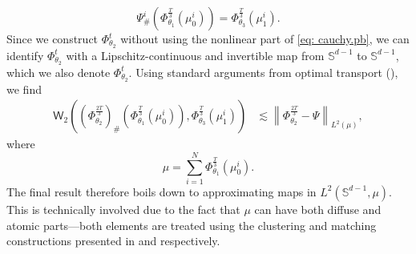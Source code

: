\documentclass[a4paper,11pt]{article}
\theoremstyle{plain}
\renewcommand{\S}{\mathbb{S}^{d-1}}
\numberwithin{equation}{section}
\begin{document}
\begin{enumerate}
\begin{equation*}
    \Psi^i_\#\left(\Phi_{\theta_1}^{\frac{T}{3}}(\mu_0^i)\right) = \Phi^{\frac{T}{3}}_{\theta_3}(\mu_1^i).
\end{equation*} 
Since we construct $\Phi^t_{\theta_2}$ without using the nonlinear part of \eqref{eq: cauchy.pb}, we can identify $\Phi_{\theta_2}^t$ with a Lipschitz-continuous and invertible map from $\S$ to $\S$, which we also denote $\Phi^t_{\theta_2}$. Using standard arguments from optimal transport (), we find
\begin{align*}
    \mathsf{W}_2\left( \left(\Phi^{ \frac{2T}{3} }_{\theta_2} \right)_\# \left(\Phi^{\frac{T}{3}}_{\theta_1}(\mu_0^i)\right), \Phi_{\theta_3}^{\frac{T}{3}}(\mu_1^i)\right)&\lesssim \left\|\Phi_{\theta_2}^{\frac{2T}{3}}-\Psi\right\|_{L^2(\mu)},
\end{align*}
where $$\mu=\sum_{i=1}^N \Phi_{\theta_1}^{\frac{T}{3}}(\mu_0^i).$$ 
The final result therefore boils down to approximating maps in $L^2(\S,\mu)$. This is technically involved due to the fact that $\mu$ can have both diffuse and atomic parts---both elements are treated using the clustering and matching constructions presented in {\bf {}} and {\bf {}} respectively.
\end{enumerate}
\end{document}
